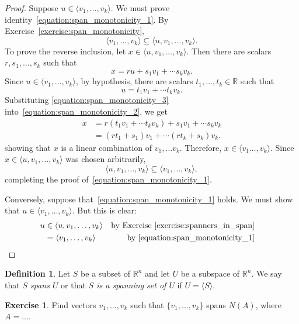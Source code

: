 \documentclass[fullpage]{amsart}
\newcommand{\RR}{\mathbb{R}}
\theoremstyle{definition}
\newtheorem{definition}[theorem]{Definition}
\newtheorem{exercise}[theorem]{Exercise}
\begin{document}
\begin{proof}
  Suppose $u\in \langle v_1,\ldots,v_k\rangle$.
  We must prove identity~\eqref{equation:span_monotonicity_1}.
  By Exercise~\ref{exercise:span_monotonicity}, 
$$\langle v_1,\ldots,v_k\rangle \subseteq \langle u, v_1,\ldots,v_k\rangle.$$
To prove the reverse inclusion, let $x\in \langle u, v_1,\ldots,v_k\rangle$.
Then there are scalars $r,s_1,\ldots,s_k$ such that
\begin{equation}\label{equation:span_monotonicity_2}
x=ru+s_1v_1+\cdots s_kv_k.
\end{equation}
Since $u\in \langle v_1,\ldots,v_k\rangle$, by hypothesis, there are scalars $t_1,\ldots,t_k\in\RR$ such that
\begin{equation}\label{equation:span_monotonicity_3}
u=t_1v_1+\cdots t_kv_k.
\end{equation}
Substituting \eqref{equation:span_monotonicity_3} into~\eqref{equation:span_monotonicity_2}, we get
\begin{align*}
x &= r(t_1v_1+\cdots t_kv_k)+s_1v_1+\cdots s_kv_k\\
&=(rt_1+s_1)v_1+\cdots (rt_k+s_k)v_k.
\end{align*}
showing that $x$ is a linear combination of $v_1,\ldots v_k$.
Therefore, $x\in \langle v_1\ldots,v_k\rangle$.
Since $x\in \langle u, v_1,\ldots,v_k\rangle$ was chosen arbitrarily,
$$
\langle u, v_1,\ldots,v_k\rangle
\subseteq \langle v_1,\ldots,v_k\rangle,
$$
completing the proof of~\eqref{equation:span_monotonicity_1}.

Conversely, suppose that~\eqref{equation:span_monotonicity_1} holds.
We must show that $u\in\langle v_1,\ldots,v_k\rangle$. But this is clear:
\begin{align*}
  u&\in \langle u,v_1,\ldots,v_k\rangle & \text{by Exercise~\ref{exercise:spanners_in_span}}\\
  &=\langle v_1,\ldots,v_k\rangle &\text{by~\eqref{equation:span_monotonicity_1}} &\qedhere
\end{align*}
\end{proof}


\begin{definition}
  Let $S$ be a subset of $\RR^n$ and let $U$ be a subspace of $\RR^n$.
We say that \emph{$S$ spans $U$} or that \emph{$S$ is a spanning set of $U$} if $U=\langle S\rangle$.
\end{definition}

\begin{exercise}
Find vectors $v_1,\ldots,v_k$ such that $\{v_1,\ldots,v_k\}$ spans $N(A)$, where $A=...$.
\end{exercise}
\end{document}
